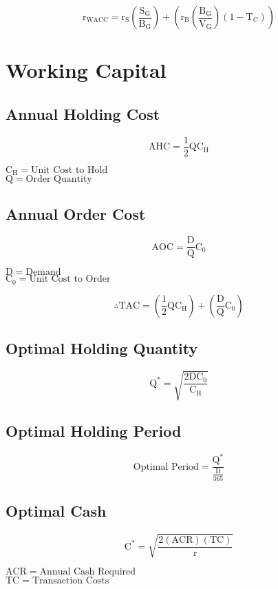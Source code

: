 \documentclass[11pt, english]{article}
\begin{document}
	$$\mathrm{r_{WACC}=r_S\left(\frac{S_G}{B_G}\right)+\left(r_B\left(\frac{B_G}{V_G}\right)(1-T_C)\right)}$$

\newpage

\section{Working Capital}

	\subsection{Annual Holding Cost}

	$$\mathrm{AHC=\frac{1}{2}QC_H}$$

	$\mathrm{C_H=\textrm{Unit Cost to Hold}}$\\
	$\mathrm{Q=\textrm{Order Quantity}}$

	\subsection{Annual Order Cost}

	$$\mathrm{AOC=\frac{D}{Q}C_0}$$

	$\mathrm{D=\textrm{Demand}}$\\
	$\mathrm{C_0=\textrm{Unit Cost to Order}}$

	$$\mathrm{\therefore TAC=(\frac{1}{2}QC_H)+(\frac{D}{Q}C_0)}$$

	\subsection{Optimal Holding Quantity}

	$$\mathrm{Q^*=\sqrt{\frac{2DC_0}{C_H}}}$$

	\subsection{Optimal Holding Period}

	$$\mathrm{\textrm{Optimal Period}=\frac{Q^*}{\frac{D}{365}}}$$

	\subsection{Optimal Cash}

	$$\mathrm{C^*=\sqrt{\frac{2(ACR)(TC)}{r}}}$$

	$\mathrm{ACR=\textrm{Annual Cash Required}}$\\
	$\mathrm{TC=\textrm{Transaction Costs}}$
\end{document}
